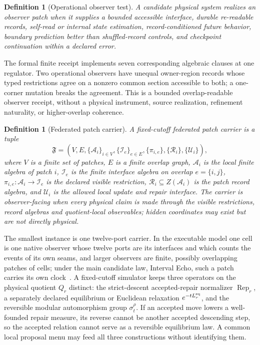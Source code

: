 \documentclass[11pt]{article}
\newtheorem{definition}[theorem]{Definition}
\theoremstyle{remark}
\theoremstyle{plain}
\begin{document}
\begin{definition}[Operational observer test]\label{def:operational-observer-test}
A candidate physical system realizes an observer patch when it supplies a bounded accessible
interface, durable re-readable records, self-read or internal state estimation, record-conditioned
future behavior, boundary prediction better than shuffled-record controls, and checkpoint
continuation within a declared error.
\end{definition}

The formal finite receipt implements seven corresponding algebraic clauses at
one regulator. Two operational observers have unequal owner-region records
whose typed restrictions agree on a nonzero common section accessible to both;
a one-corner mutation breaks the agreement. This is a bounded
overlap-readable observer receipt, without a physical instrument, source
realization, refinement naturality, or higher-overlap coherence.

\begin{definition}[Federated patch carrier]
\label{def:federated-patch-carrier}
A fixed-cutoff federated patch carrier is a tuple
\[
\mathfrak F=(V,E,\{\mathcal A_i\}_{i\in V},\{\mathcal I_e\}_{e\in E},
\{\pi_{i,e}\},\{\mathcal R_i\},\{\mathcal U_i\}),
\]
where \(V\) is a finite set of patches, \(E\) is a finite overlap graph,
\(\mathcal A_i\) is the local finite algebra of patch \(i\), \(\mathcal I_e\) is the finite
interface algebra on overlap \(e=\{i,j\}\), \(\pi_{i,e}:\mathcal A_i\to\mathcal I_e\) is the
declared visible restriction, \(\mathcal R_i\subseteq Z(\mathcal A_i)\) is the patch record
algebra, and \(\mathcal U_i\) is the allowed local update and repair interface.
The carrier is observer-facing when every physical claim is made through the
visible restrictions, record algebras and quotient-local observables; hidden
coordinates may exist but are not directly physical.
\end{definition}

The smallest instance is one twelve-port carrier. In the executable model
one cell is one native observer whose twelve ports are its interfaces and
which counts the events of its own seams, and larger observers are finite,
possibly overlapping patches of cells; under the main candidate law,
Interval Echo, such a patch carries its own clock~\cite{ophmodel}. A fixed-cutoff
simulator keeps three operators on the physical quotient \(Q_r\) distinct:
the strict-descent accepted-repair normalizer \(\operatorname{Rep}_r\), a
separately declared equilibrium or Euclidean relaxation \(e^{-tL_r^{\rm eq}}\),
and the reversible modular automorphism group \(\sigma_t^\rho\). If an
accepted move lowers a well-founded repair measure, its reverse cannot be
another accepted descending step, so the accepted relation cannot serve as a
reversible equilibrium law. A common local proposal menu may feed all three
constructions without identifying them.
\end{document}
